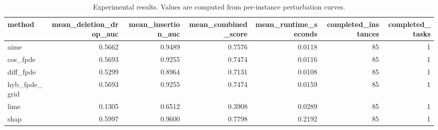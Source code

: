 \begin{table}[t]
\caption{Experimental results. Values are computed from per-instance perturbation curves.}
\label{tab:main_results_computed}
\centering
\begin{tabular}{lrrrrrr}
\toprule
method & mean\_deletion\_drop\_auc & mean\_insertion\_auc & mean\_combined\_score & mean\_runtime\_seconds & completed\_instances & completed\_tasks \\
\midrule
aime & 0.5662 & 0.9489 & 0.7576 & 0.0118 & 85 & 1 \\
cos\_fpde & 0.5693 & 0.9255 & 0.7474 & 0.0116 & 85 & 1 \\
diff\_fpde & 0.5299 & 0.8964 & 0.7131 & 0.0108 & 85 & 1 \\
hyb\_fpde\_grid & 0.5693 & 0.9255 & 0.7474 & 0.0159 & 85 & 1 \\
lime & 0.1305 & 0.6512 & 0.3908 & 0.0289 & 85 & 1 \\
shap & 0.5997 & 0.9600 & 0.7798 & 0.2192 & 85 & 1 \\
\bottomrule
\end{tabular}

\end{table}
